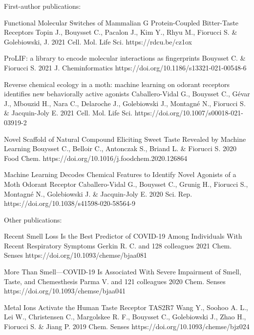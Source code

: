 
\begin{cvpublications}{First-author publications:}

	{Functional Molecular Switches of Mammalian G Protein-Coupled Bitter-Taste Receptors}
	{Topin J., Bouysset C., Pacalon J., Kim Y., Rhyu M., Fiorucci S. \& Golebiowski, J.}
	{2021}
    {Cell. Mol. Life Sci.}
    {https://rdcu.be/cz1ox}

	{ProLIF: a library to encode molecular interactions as fingerprints}
	{Bouysset C. \& Fiorucci S.}
	{2021}
    {J. Cheminformatics}
    {https://doi.org/10.1186/s13321-021-00548-6}

	{Reverse chemical ecology in a moth: machine learning on odorant receptors identifies new behaviorally active agonists}
	{Caballero-Vidal G., Bouysset C., Gévar J., Mbouzid H., Nara C., Delaroche J., Golebiowski J., Montagné N., Fiorucci S. \& Jacquin-Joly E.}
	{2021}
    {Cell. Mol. Life Sci.}
	{https://doi.org/10.1007/s00018-021-03919-2}

	{Novel Scaffold of Natural Compound Eliciting Sweet Taste Revealed by Machine Learning}
	{Bouysset C., Belloir C., Antonczak S., Briand L. \& Fiorucci S.}
	{2020}
	{Food Chem.}
	{https://doi.org/10.1016/j.foodchem.2020.126864}

	{Machine Learning Decodes Chemical Features to Identify Novel Agonists of a Moth Odorant Receptor}
	{Caballero-Vidal G., Bouysset C., Grunig H., Fiorucci S., Montagné N., Golebiowski J. \& Jacquin-Joly E.}
	{2020}
	{Sci. Rep.}
	{https://doi.org/10.1038/s41598-020-58564-9}

\end{cvpublications}

\begin{cvpublications}{Other publications:}

	{Recent Smell Loss Is the Best Predictor of COVID-19 Among Individuals With Recent Respiratory Symptoms}
	{Gerkin R. C. and 128 colleagues}
    {2021}
	{Chem. Senses}
    {https://doi.org/10.1093/chemse/bjaa081}

	{More Than Smell—COVID-19 Is Associated With Severe Impairment of Smell, Taste, and Chemesthesis}
	{Parma V. and 121 colleagues}
    {2020}
	{Chem. Senses}
    {https://doi.org/10.1093/chemse/bjaa041}

	{Metal Ions Activate the Human Taste Receptor TAS2R7}
	{Wang Y., Soohoo A. L., Lei W., Christensen C., Margolskee R. F., Bouysset C., Golebiowski J., Zhao H., Fiorucci S. \& Jiang P.}
    {2019}
	{Chem. Senses}
    {https://doi.org/10.1093/chemse/bjz024}

\end{cvpublications}
